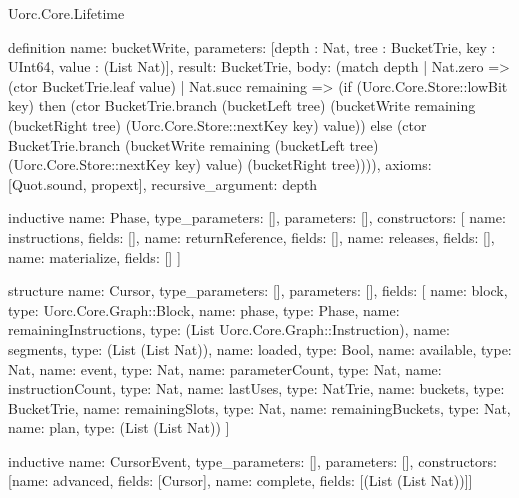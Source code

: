 \begin{lexlean}{Uorc.Core.Lifetime}
\begin{semanticmodule}
definition{
  name: bucketWrite,
  parameters: [depth : Nat, tree : BucketTrie, key : UInt64, value : (List Nat)],
  result: BucketTrie,
  body: (match depth
    | Nat.zero => (ctor BucketTrie.leaf value)
    | Nat.succ remaining => (if (Uorc.Core.Store::lowBit key) then (ctor BucketTrie.branch (bucketLeft tree) (bucketWrite remaining (bucketRight tree) (Uorc.Core.Store::nextKey key) value)) else (ctor BucketTrie.branch (bucketWrite remaining (bucketLeft tree) (Uorc.Core.Store::nextKey key) value) (bucketRight tree)))),
  axioms: [Quot.sound, propext],
  recursive_argument: depth
}

inductive{
  name: Phase,
  type_parameters: [],
  parameters: [],
  constructors: [
    {name: instructions, fields: []},
    {name: returnReference, fields: []},
    {name: releases, fields: []},
    {name: materialize, fields: []}
  ]
}

structure{
  name: Cursor,
  type_parameters: [],
  parameters: [],
  fields: [
    {name: block, type: Uorc.Core.Graph::Block},
    {name: phase, type: Phase},
    {name: remainingInstructions, type: (List Uorc.Core.Graph::Instruction)},
    {name: segments, type: (List (List Nat))},
    {name: loaded, type: Bool},
    {name: available, type: Nat},
    {name: event, type: Nat},
    {name: parameterCount, type: Nat},
    {name: instructionCount, type: Nat},
    {name: lastUses, type: NatTrie},
    {name: buckets, type: BucketTrie},
    {name: remainingSlots, type: Nat},
    {name: remainingBuckets, type: Nat},
    {name: plan, type: (List (List Nat))}
  ]
}

inductive{
  name: CursorEvent,
  type_parameters: [],
  parameters: [],
  constructors: [{name: advanced, fields: [Cursor]}, {name: complete, fields: [(List (List Nat))]}]
}


\end{semanticmodule}
\end{lexlean}
